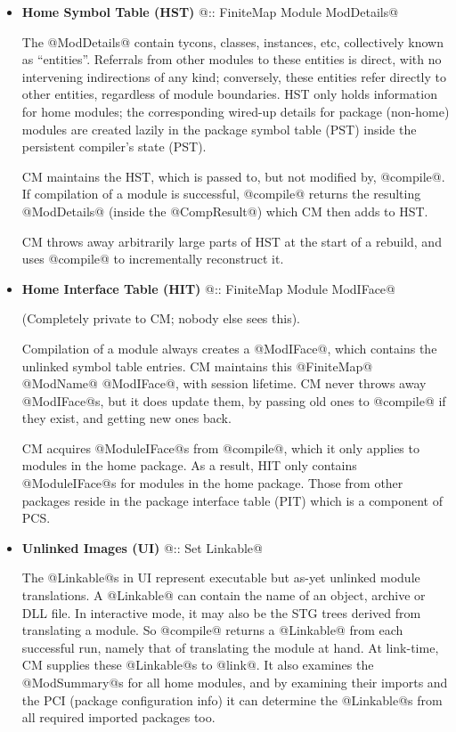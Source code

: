 \documentclass[11pt]{article}
\begin{document}
\begin{itemize}
\item
   {\bf Home Symbol Table (HST)} @:: FiniteMap Module ModDetails@

   The @ModDetails@ contain tycons, classes, instances,
   etc, collectively known as ``entities''.  Referrals from other
   modules to these entities is direct, with no intervening
   indirections of any kind; conversely, these entities refer directly
   to other entities, regardless of module boundaries.  HST only
   holds information for home modules; the corresponding wired-up
   details for package (non-home) modules are created lazily in
   the package symbol table (PST) inside the persistent compiler's state
   (PST).

   CM maintains the HST, which is passed to, but not modified by,
   @compile@.  If compilation of a module is successful, @compile@
   returns the resulting @ModDetails@ (inside the @CompResult@) which
   CM then adds to HST.

   CM throws away arbitrarily large parts of HST at the start of a
   rebuild, and uses @compile@ to incrementally reconstruct it.

\item
   {\bf Home Interface Table (HIT)} @:: FiniteMap Module ModIFace@

   (Completely private to CM; nobody else sees this).

   Compilation of a module always creates a @ModIFace@, which contains
   the unlinked symbol table entries.  CM maintains this @FiniteMap@
   @ModName@ @ModIFace@, with session lifetime.  CM never throws away
   @ModIFace@s, but it does update them, by passing old ones to
   @compile@ if they exist, and getting new ones back.

   CM acquires @ModuleIFace@s from @compile@, which it only applies
   to modules in the home package.  As a result, HIT only contains
   @ModuleIFace@s for modules in the home package.  Those from other
   packages reside in the package interface table (PIT) which is a
   component of PCS.

\item
   {\bf Unlinked Images (UI)} @:: Set Linkable@

   The @Linkable@s in UI represent executable but as-yet unlinked
   module translations.  A @Linkable@ can contain the name of an
   object, archive or DLL file.  In interactive mode, it may also be
   the STG trees derived from translating a module.  So @compile@
   returns a @Linkable@ from each successful run, namely that of
   translating the module at hand.  At link-time, CM supplies these
   @Linkable@s to @link@.  It also examines the @ModSummary@s for all
   home modules, and by examining their imports and the PCI (package
   configuration info) it can determine the @Linkable@s from all
   required imported packages too.


\end{itemize}
\end{document}
